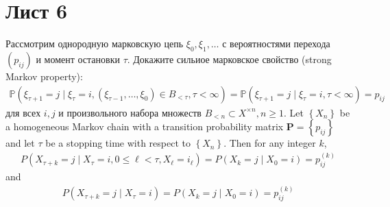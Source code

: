 \section{Лист 6}
    \begin{prob}
        Рассмотрим однородную марковскую цепь $\xi_{0}, \xi_{1}, \ldots$ с вероятностями перехода $\left(p_{i j}\right)$ и момент остановки $\tau$. Докажите сильиое марковское свойство (strong Markov property):
        \begin{gather*}
            \mathbb{P}
            \left(
                \xi_{\tau+1}= j \mid \xi_{\tau}=i, \left(
                                                        \xi_{\tau-1}, \ldots, \xi_{0}
                                                    \right) \in B_{<\tau}, \tau<\infty
            \right)
            = \mathbb{P}
            \left(
                \xi_{\tau+1}=j \mid \xi_{\tau}=i, \tau<\infty
            \right)
            = p_{i j}
        \end{gather*}
        для всех $i, j$ и произвольного набора множеств $B_{<n} \subset X^{\times n}, n \geqslant 1$.
        \vskip 0.4in
        Let $\left\{X_{n}\right\}$ be a homogeneous Markov chain with a transition probability matrix $\mathbf{P}=\left\{p_{i j}\right\}$ and let $\tau$ be a stopping time with respect to $\left\{X_{n}\right\}$. Then for any integer $k$,
        \begin{gather*}
            P\left(X_{\tau+k}=j \mid X_{\tau}=i, 0 \leq \ell<\tau, X_{\ell}=i_{\ell}\right)=P\left(X_{k}=j \mid X_{0}=i\right)=p_{i j}^{(k)}
        \end{gather*}
        and
        \begin{gather*}
            P\left(X_{\tau+k}=j \mid X_{\tau}=i\right)=P\left(X_{k}=j \mid X_{0}=i\right)=p_{i j}^{(k)}
        \end{gather*}
    \end{prob}
